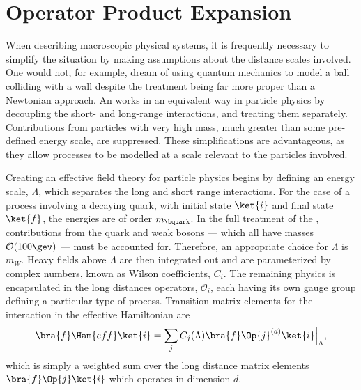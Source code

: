 \section{Operator Product Expansion}

When describing macroscopic physical systems, it is frequently necessary to simplify the situation
by making assumptions about the distance scales involved.
One would not, for example, dream of using quantum mechanics to model a ball colliding with a wall
despite the treatment being far more proper than a Newtonian approach.
An \EFT works in an equivalent way in particle physics
by decoupling the short- and long-range interactions, and treating them separately.
Contributions from particles with very high mass, much greater than some pre-defined energy scale,
are suppressed.
These simplifications are advantageous, as they allow processes to be modelled at a scale
relevant to the particles involved.

Creating an effective field theory for particle physics begins by defining an energy scale,
$\Lambda$, which separates the long and short range interactions.
For the case of a process involving a decaying \bquark quark, with initial state $\ket{i}$ and
final state $\ket{f}$,
the energies are of order $m_\bquark$.
In the full treatment of the \sm, contributions from the \tquark quark and weak bosons --- which all
have masses $\mathcal{O}(100\gev)$ --- must be accounted for.
Therefore, an appropriate choice for $\Lambda$ is \approx$m_W$.
Heavy fields above $\Lambda$ are then integrated out and are parameterized by complex numbers,
known as Wilson coefficients, $C_i$.
The remaining physics is encapsulated in the long distances operators, $\mathcal{O}_i$, each having
its own gauge group defining a particular type of process.
Transition matrix elements for the interaction in the effective Hamiltonian are
\begin{equation}
  \bra{f}\Ham{eff}\ket{i} =
  \sum_j C_j(\Lambda)\bra{f}\Op{j}^{(d)}\ket{i}\Big|_{\Lambda},
  \label{eq:th:opeham}
\end{equation}
which is simply a weighted sum over the long distance matrix elements $\bra{f}\Op{j}\ket{i}$ which
operates in dimension $d$.

